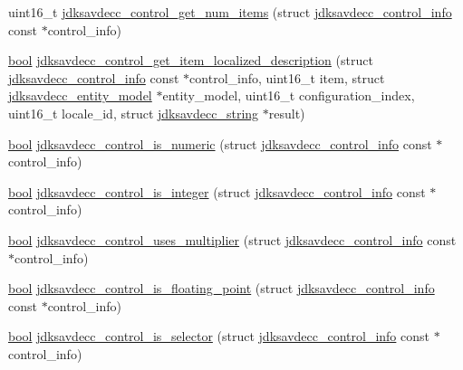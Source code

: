 \begin{DoxyCompactItemize}
\item 
uint16\+\_\+t \hyperlink{group__aem__control__value__helpers_gaf395d8da62852c6bb63e7cd084e1a5a5}{jdksavdecc\+\_\+control\+\_\+get\+\_\+num\+\_\+items} (struct \hyperlink{structjdksavdecc__control__info}{jdksavdecc\+\_\+control\+\_\+info} const $\ast$control\+\_\+info)
\item 
\hyperlink{avb__gptp_8h_af6a258d8f3ee5206d682d799316314b1}{bool} \hyperlink{group__aem__control__value__helpers_ga798473258129edf5d315cd3df761510d}{jdksavdecc\+\_\+control\+\_\+get\+\_\+item\+\_\+localized\+\_\+description} (struct \hyperlink{structjdksavdecc__control__info}{jdksavdecc\+\_\+control\+\_\+info} const $\ast$control\+\_\+info, uint16\+\_\+t item, struct \hyperlink{structjdksavdecc__entity__model}{jdksavdecc\+\_\+entity\+\_\+model} $\ast$entity\+\_\+model, uint16\+\_\+t configuration\+\_\+index, uint16\+\_\+t locale\+\_\+id, struct \hyperlink{structjdksavdecc__string}{jdksavdecc\+\_\+string} $\ast$result)
\item 
\hyperlink{avb__gptp_8h_af6a258d8f3ee5206d682d799316314b1}{bool} \hyperlink{group__aem__control__value__helpers_gab6967335e6cc8a63c4ff1d78bd6117fc}{jdksavdecc\+\_\+control\+\_\+is\+\_\+numeric} (struct \hyperlink{structjdksavdecc__control__info}{jdksavdecc\+\_\+control\+\_\+info} const $\ast$control\+\_\+info)
\item 
\hyperlink{avb__gptp_8h_af6a258d8f3ee5206d682d799316314b1}{bool} \hyperlink{group__aem__control__value__helpers_gac71279dfee5935a76b42040c87de8ea6}{jdksavdecc\+\_\+control\+\_\+is\+\_\+integer} (struct \hyperlink{structjdksavdecc__control__info}{jdksavdecc\+\_\+control\+\_\+info} const $\ast$control\+\_\+info)
\item 
\hyperlink{avb__gptp_8h_af6a258d8f3ee5206d682d799316314b1}{bool} \hyperlink{group__aem__control__value__helpers_gac444002e7137ac43efdb42deab02c193}{jdksavdecc\+\_\+control\+\_\+uses\+\_\+multiplier} (struct \hyperlink{structjdksavdecc__control__info}{jdksavdecc\+\_\+control\+\_\+info} const $\ast$control\+\_\+info)
\item 
\hyperlink{avb__gptp_8h_af6a258d8f3ee5206d682d799316314b1}{bool} \hyperlink{group__aem__control__value__helpers_ga91a04472df3cdff290d17889f7de64f0}{jdksavdecc\+\_\+control\+\_\+is\+\_\+floating\+\_\+point} (struct \hyperlink{structjdksavdecc__control__info}{jdksavdecc\+\_\+control\+\_\+info} const $\ast$control\+\_\+info)
\item 
\hyperlink{avb__gptp_8h_af6a258d8f3ee5206d682d799316314b1}{bool} \hyperlink{group__aem__control__value__helpers_ga4877bd0fd15d8d77bd66beea6fe5a863}{jdksavdecc\+\_\+control\+\_\+is\+\_\+selector} (struct \hyperlink{structjdksavdecc__control__info}{jdksavdecc\+\_\+control\+\_\+info} const $\ast$control\+\_\+info)

\end{DoxyCompactItemize}
